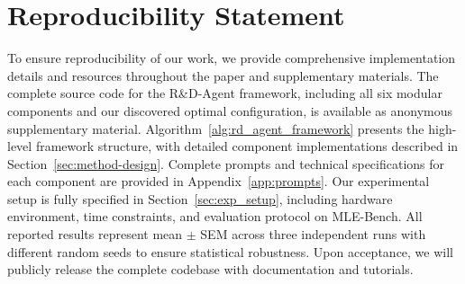 \section*{Reproducibility Statement}
To ensure reproducibility of our work, we provide comprehensive implementation details and resources throughout the paper and supplementary materials. The complete source code for the R\&D-Agent framework, including all six modular components and our discovered optimal configuration, is available as anonymous supplementary material. Algorithm~\ref{alg:rd_agent_framework} presents the high-level framework structure, with detailed component implementations described in Section~\ref{sec:method-design}. Complete prompts and technical specifications for each component are provided in Appendix~\ref{app:prompts}. Our experimental setup is fully specified in Section~\ref{sec:exp_setup}, including hardware environment, time constraints, and evaluation protocol on MLE-Bench. All reported results represent mean $\pm$ SEM across three independent runs with different random seeds to ensure statistical robustness. Upon acceptance, we will publicly release the complete codebase with documentation and tutorials.